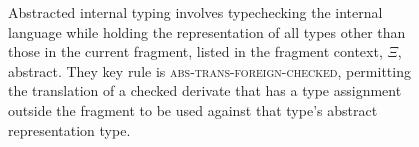 \documentclass[9pt,preprint]{sigplanconf}
\begin{document}
\begin{figure}[t]
\begin{mathpar}
%
%


%
%
%
%
%
%


\end{mathpar}
\caption{\small Abstracted internal typing involves typechecking the internal language while holding the representation of all types other than those in the current fragment, listed in the fragment context, $\Xi$, abstract. They key rule is \textsc{abs-trans-foreign-checked}, permitting the translation of a checked derivate that has a type assignment outside the fragment to be used against that type's abstract representation type.}
\label{ait}
\end{figure}
\end{document}
